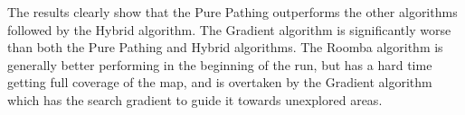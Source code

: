 The results clearly show that the Pure Pathing outperforms the other algorithms followed by the Hybrid algorithm. The Gradient algorithm is significantly worse than both the Pure Pathing and Hybrid algorithms. The Roomba algorithm is generally better performing in the beginning of the run, but has a hard time getting full coverage of the map, and is overtaken by the Gradient algorithm which has the search gradient to guide it towards unexplored areas.


